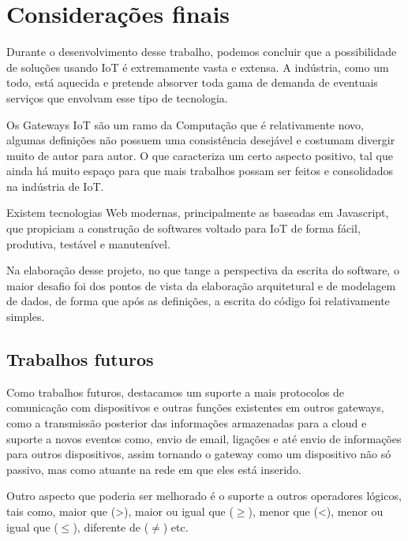 \section{Considerações finais}

Durante o desenvolvimento desse trabalho, podemos concluir que a possibilidade de soluções usando IoT é extremamente vasta e extensa. A indústria, como um todo, está aquecida e pretende absorver toda gama de demanda de eventuais serviços que envolvam esse tipo de tecnologia.

Os Gateways IoT são um ramo da Computação que é relativamente novo, algumas definições não possuem uma consistência desejável e costumam divergir muito de autor para autor. O que caracteriza um certo aspecto positivo, tal que ainda há muito espaço para que mais trabalhos possam ser feitos e consolidados na indústria de IoT.

Existem tecnologias Web modernas, principalmente as baseadas em Javascript, que propiciam a construção de softwares voltado para IoT de forma fácil, produtiva, testável e manutenível.

Na elaboração desse projeto, no que tange a perspectiva da escrita do software, o maior desafio foi dos pontos de vista da elaboração arquitetural e de modelagem de dados, de forma que após as definições, a escrita do código foi relativamente simples.

\subsection{Trabalhos futuros}
\label{trabalhosFuturos}

Como trabalhos futuros, destacamos um suporte a mais protocolos de comunicação com dispositivos e outras funções existentes em outros gateways, como a transmissão posterior das informações armazenadas para a cloud e suporte a novos eventos como, envio de email, ligações e até envio de informações para outros dispositivos, assim tornando o gateway como um dispositivo não só passivo, mas como atuante na rede em que eles está inserido.


Outro aspecto que poderia ser melhorado é o suporte a outros operadores lógicos, tais como, maior que (>), maior ou igual que (\begin{math} \geq \end{math}), menor que (<), menor ou igual que (\begin{math} \leq \end{math}), diferente de (\begin{math}\ne\end{math}) etc.



